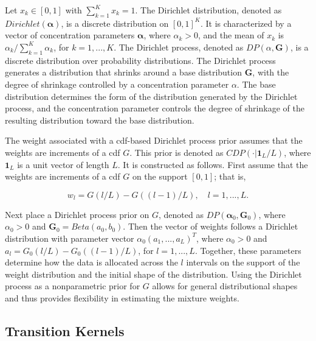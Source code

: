 \documentclass[
  letterpaper,
  double,
  12pt,
  1.0in]{beavtex}
\begin{document}
Let \(x_k \in [0, 1]\) with \(\sum_{k=1}^K x_k = 1\). The Dirichlet
distribution, denoted as \(Dirichlet(\boldsymbol{\alpha})\), is a
discrete distribution on \([0, 1]^K\). It is characterized by a vector
of concentration parameters \(\boldsymbol{\alpha}\), where
\(\alpha_k > 0\), and the mean of \(x_k\) is
\(\alpha_k / \sum_{k=1}^K \alpha_k\), for \(k=1,...,K\). The Dirichlet
process, denoted as \(DP(\alpha, \boldsymbol{G})\), is a discrete
distribution over probability distributions. The Dirichlet process
generates a distribution that shrinks around a base distribution
\(\boldsymbol{G}\), with the degree of shrinkage controlled by a
concentration parameter \(\alpha\). The base distribution determines the
form of the distribution generated by the Dirichlet process, and the
concentration parameter controls the degree of shrinkage of the
resulting distribution toward the base distribution.

The weight associated with a cdf-based Dirichlet process prior assumes
that the weights are increments of a cdf \(G\). This prior is denoted as
\(CDP(\cdot | \boldsymbol{1}_L / L)\), where \(\boldsymbol{1}_L\) is a
unit vector of length \(L\). It is constructed as follows. First assume
that the weights are increments of a cdf \(G\) on the support \([0,1]\);
that is,

\begin{equation}
w_l = G(l/L) - G((l - 1)/L), \quad l = 1,..., L.   
\end{equation}

Next place a Dirichlet process prior on \(G\), denoted as
\(DP(\boldsymbol{\alpha}_0, \boldsymbol{G}_0)\), where \(\alpha_0 > 0\)
and \(\boldsymbol{G}_0 = Beta(a_0, b_0)\). Then the vector of weights
follows a Dirichlet distribution with parameter vector
\(\alpha_0 {(a_1, ..., a_L)}^T\), where \(\alpha_0 > 0\) and
\(a_l = G_0(l/L) - G_0((l - 1)/L)\), for \(l = 1,..., L\). Together,
these parameters determine how the data is allocated across the \(l\)
intervals on the support of the weight distribution and the initial
shape of the distribution. Using the Dirichlet process as a
nonparametric prior for \(G\) allows for general distributional shapes
and thus provides flexibility in estimating the mixture weights.

\subsection{Transition Kernels}\label{transitionkernels}
\end{document}
